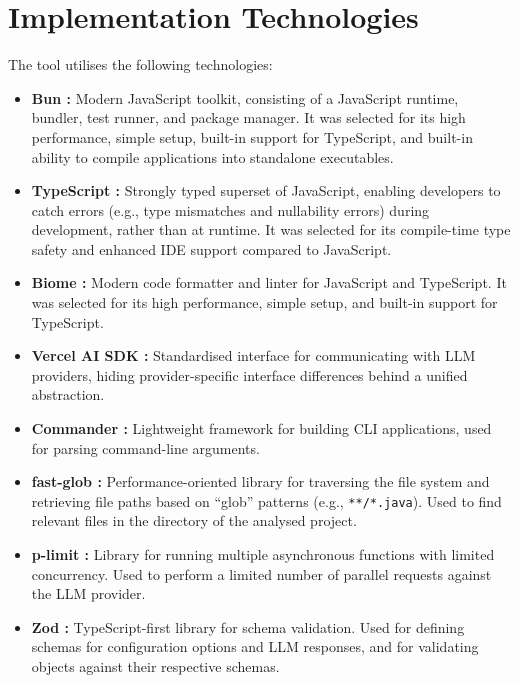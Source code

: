 \section{Implementation Technologies}

The tool utilises the following technologies:

\begin{itemize}
    \item \textbf{Bun :} Modern JavaScript toolkit, consisting of a JavaScript runtime, bundler, test runner, and package manager. It was selected for its high performance, simple setup, built-in support for TypeScript, and built-in ability to compile applications into standalone executables.
    \item \textbf{TypeScript :} Strongly typed superset of JavaScript, enabling developers to catch errors (e.g., type mismatches and nullability errors) during development, rather than at runtime. It was selected for its compile-time type safety and enhanced IDE support compared to JavaScript.
    \item \textbf{Biome :} Modern code formatter and linter for JavaScript and TypeScript. It was selected for its high performance, simple setup, and built-in support for TypeScript.
    \item \textbf{Vercel AI SDK :} Standardised interface for communicating with LLM providers, hiding provider-specific interface differences behind a unified abstraction.
    \item \textbf{Commander :} Lightweight framework for building CLI applications, used for parsing command-line arguments.
    \item \textbf{fast-glob :} Performance-oriented library for traversing the file system and retrieving file paths based on “glob” patterns (e.g., \texttt{**/*.java}). Used to find relevant files in the directory of the analysed project.
    \item \textbf{p-limit :} Library for running multiple asynchronous functions with limited concurrency. Used to perform a limited number of parallel requests against the LLM provider.
    \item \textbf{Zod :} TypeScript-first library for schema validation. Used for defining schemas for configuration options and LLM responses, and for validating objects against their respective schemas.
\end{itemize}

